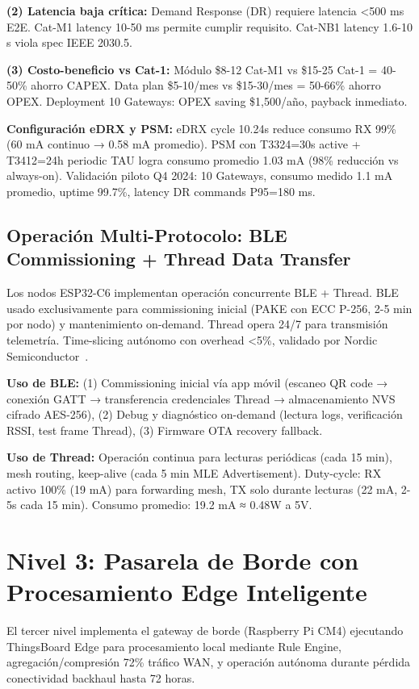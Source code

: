 \textbf{(2) Latencia baja crítica:} Demand Response (DR) requiere latencia <500 ms E2E. Cat-M1 latency 10-50 ms permite cumplir requisito. Cat-NB1 latency 1.6-10 s viola spec IEEE 2030.5.

\textbf{(3) Costo-beneficio vs Cat-1:} Módulo \$8-12 Cat-M1 vs \$15-25 Cat-1 = 40-50\% ahorro CAPEX. Data plan \$5-10/mes vs \$15-30/mes = 50-66\% ahorro OPEX. Deployment 10 Gateways: OPEX saving \$1,500/año, payback inmediato.

\textbf{Configuración eDRX y PSM:} eDRX cycle 10.24s reduce consumo RX 99\% (60 mA continuo → 0.58 mA promedio). PSM con T3324=30s active + T3412=24h periodic TAU logra consumo promedio 1.03 mA (98\% reducción vs always-on). Validación piloto Q4 2024: 10 Gateways, consumo medido 1.1 mA promedio, uptime 99.7\%, latency DR commands P95=180 ms.

\subsection{Operación Multi-Protocolo: BLE Commissioning + Thread Data Transfer}

Los nodos ESP32-C6 implementan operación concurrente BLE + Thread. BLE usado exclusivamente para commissioning inicial (PAKE con ECC P-256, 2-5 min por nodo) y mantenimiento on-demand. Thread opera 24/7 para transmisión telemetría. Time-slicing autónomo con overhead <5\%, validado por Nordic Semiconductor~\cite{NordicThread2024}.

\textbf{Uso de BLE:} (1) Commissioning inicial vía app móvil (escaneo QR code → conexión GATT → transferencia credenciales Thread → almacenamiento NVS cifrado AES-256), (2) Debug y diagnóstico on-demand (lectura logs, verificación RSSI, test frame Thread), (3) Firmware OTA recovery fallback.

\textbf{Uso de Thread:} Operación continua para lecturas periódicas (cada 15 min), mesh routing, keep-alive (cada 5 min MLE Advertisement). Duty-cycle: RX activo 100\% (19 mA) para forwarding mesh, TX solo durante lecturas (22 mA, 2-5s cada 15 min). Consumo promedio: 19.2 mA ≈ 0.48W a 5V.

\section{Nivel 3: Pasarela de Borde con Procesamiento Edge Inteligente}

El tercer nivel implementa el gateway de borde (Raspberry Pi CM4) ejecutando ThingsBoard Edge para procesamiento local mediante Rule Engine, agregación/compresión 72\% tráfico WAN, y operación autónoma durante pérdida conectividad backhaul hasta 72 horas.

